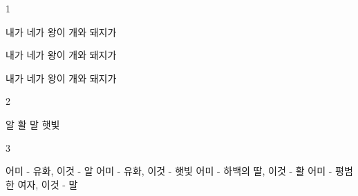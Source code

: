\documentclass[fs9,seriesFre]{korfarm-base}
\begin{document}
\kfActivityBg \par{}
\par{}\par\nopagebreak[4]\smallskip\nopagebreak[4]
\kfBeginMC
\begin{kfSentenceUnit}{1}{}
\begin{kfChoices}
\kfChoice 내가
\kfChoice 네가
\kfChoice 왕이
\kfChoice 개와 돼지가
\end{kfChoices}
\begin{kfChoices}
\kfChoice 내가
\kfChoice 네가
\kfChoice 왕이
\kfChoice 개와 돼지가
\end{kfChoices}
\begin{kfChoices}
\kfChoice 내가
\kfChoice 네가
\kfChoice 왕이
\kfChoice 개와 돼지가
\end{kfChoices}
\end{kfSentenceUnit}

\begin{kfSentenceUnit}{2}{}
\begin{kfChoices}
\kfChoice 알
\kfChoice 활
\kfChoice 말
\kfChoice 햇빛
\end{kfChoices}
\end{kfSentenceUnit}

\begin{kfSentenceUnit}{3}{}
\begin{kfChoices}
\kfChoice 어미 - 유화, 이것 - 알
\kfChoice 어미 - 유화, 이것 - 햇빛
\kfChoice 어미 - 하백의 딸, 이것 - 활
\kfChoice 어미 - 평범한 여자, 이것 - 말
\end{kfChoices}
\end{kfSentenceUnit}

\kfEndMC

\end{document}

